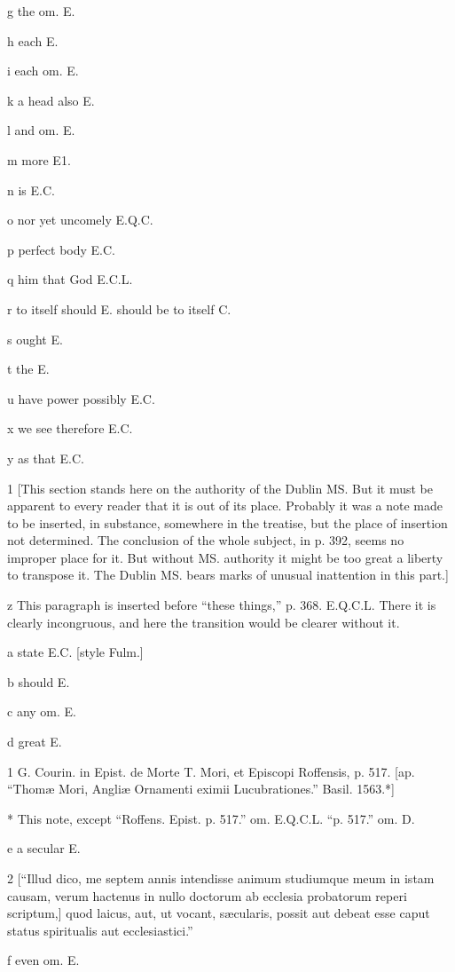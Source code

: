 g
the om. E.

h
each E.

i
each om. E.

k
a head also E.

l
and om. E.

m
more E1.

n
is E.C.

o
nor yet uncomely E.Q.C.

p
perfect body E.C.

q
him that God E.C.L.

r
to itself should E. should be to itself C.

s
ought E.

t
the E.

u
have power possibly E.C.

x
we see therefore E.C.

y
as that E.C.

1
[This section stands here on the authority of the Dublin MS. But it must be apparent to every reader that it is out of its place. Probably it was a note made to be inserted, in substance, somewhere in the treatise, but the place of insertion not determined. The conclusion of the whole subject, in p. 392, seems no improper place for it. But without MS. authority it might be too great a liberty to transpose it. The Dublin MS. bears marks of unusual inattention in this part.]

z
This paragraph is inserted before “these things,” p. 368. E.Q.C.L. There it is clearly incongruous, and here the transition would be clearer without it.

a
state E.C. [style Fulm.]

b
should E.

c
any om. E.

d
great E.

1
G. Courin. in Epist. de Morte T. Mori, et Episcopi Roffensis, p. 517. [ap. “Thomæ Mori, Angliæ Ornamenti eximii Lucubrationes.” Basil. 1563.*]

*
This note, except “Roffens. Epist. p. 517.” om. E.Q.C.L. “p. 517.” om. D.

e
a secular E.

2
[“Illud dico, me septem annis intendisse animum studiumque meum in istam causam, verum hactenus in nullo doctorum ab ecclesia probatorum reperi scriptum,] quod laicus, aut, ut vocant, sæcularis, possit aut debeat esse caput status spiritualis aut ecclesiastici.”

f
even om. E.

